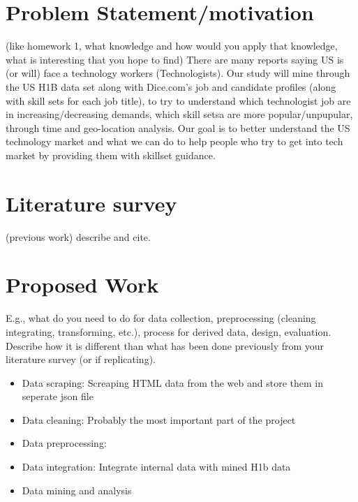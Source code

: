 \section{ Problem Statement/motivation}
(like homework 1, what knowledge and how would you apply that knowledge, what is interesting that you hope to find)
	There are many reports saying US is (or will) face a technology workers (Technologists). Our study will mine through the US H1B data set along with Dice.com's job and candidate profiles (along with skill sets for each job title), to try to understand which technologist job are in increasing/decreasing demands, which skill setsa are more popular/unpupular, through time and geo-location analysis. Our goal is to better understand the US technology market and what we can do to help people who try to get into tech market by providing them with skillset guidance. 

\section{Literature survey }
(previous work) describe and cite.
\section{Proposed Work }
E.g., what do you need to do for data collection, preprocessing (cleaning  integrating, transforming, etc.), process for derived data, design, evaluation. Describe how it is different than what has been done previously from your literature survey (or if replicating).
\begin{itemize}
	\item Data scraping: Screaping HTML data from the web and store them in seperate json file
	\item Data cleaning: Probably the most important part of the project
	\item Data preprocessing: 
	\item Data integration: Integrate internal data with mined H1b data 
	\item Data mining and analysis
\end{itemize}
